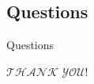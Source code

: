 \documentclass[10pt]{beamer}
\begin{document}
\subsection{Questions}
\begin{frame}{Questions}{}
  \begin{center}
    \textcolor{scred}{\LARGE $\mathscr{THANK}$ $\mathscr{YOU}!$}
  \end{center}
\end{frame}

\end{document}
